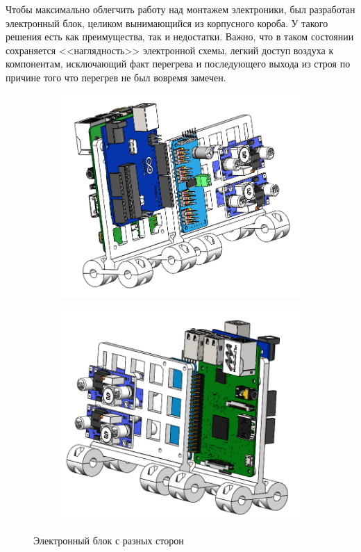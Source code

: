 Чтобы максимально облегчить работу над монтажем электроники, был разработан электронный блок, целиком вынимающийся из корпусного короба. У такого решения есть как преимущества, так и недостатки. Важно, что в таком состоянии сохраняется <<наглядность>> электронной схемы, легкий доступ воздуха к компонентам, исключающий факт перегрева и последующего выхода из строя по причине того что перегрев не был вовремя замечен.
\begin{figure}[ht]
    \centering
    \begin{subfigure}[b]{0.45\textwidth}    
        \centering
        \includegraphics[scale=0.45]{chapter_mechanics_construction/figure17.png}
        \caption{}
    \end{subfigure}
    \begin{subfigure}[b]{0.45\textwidth}
        \centering
        \includegraphics[scale=0.45]{chapter_mechanics_construction/figure18.png}
        \caption{}
    \end{subfigure}
     
    \caption{Электронный блок с разных сторон}
    \label{}
\end{figure}

